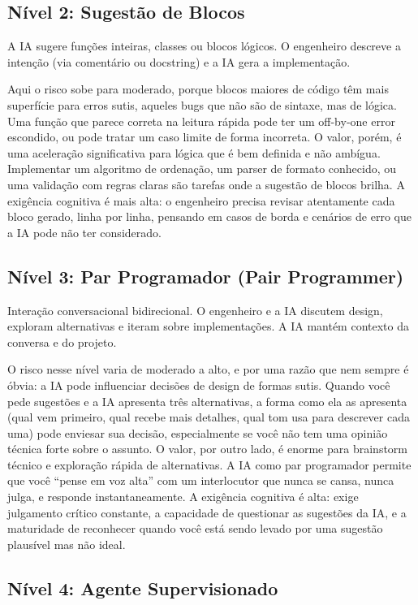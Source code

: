 \subsection{Nível 2: Sugestão de Blocos}

A IA sugere funções inteiras, classes ou blocos lógicos. O engenheiro
descreve a intenção (via comentário ou docstring) e a IA gera a
implementação.

Aqui o risco sobe para moderado, porque blocos maiores de código têm mais superfície
para erros sutis, aqueles bugs que não são de sintaxe, mas de lógica. Uma função
que parece correta na leitura rápida pode ter um off-by-one error escondido, ou pode
tratar um caso limite de forma incorreta. O valor, porém, é uma aceleração
significativa para lógica que é bem definida e não ambígua. Implementar um algoritmo
de ordenação, um parser de formato conhecido, ou uma validação com regras claras são
tarefas onde a sugestão de blocos brilha. A exigência cognitiva é mais alta: o
engenheiro precisa revisar atentamente cada bloco gerado, linha por linha, pensando
em casos de borda e cenários de erro que a IA pode não ter considerado.

\subsection{Nível 3: Par Programador (Pair Programmer)}

Interação conversacional bidirecional. O engenheiro e a IA discutem
design, exploram alternativas e iteram sobre implementações. A IA mantém
contexto da conversa e do projeto.

O risco nesse nível varia de moderado a alto, e por uma razão que nem sempre é
óbvia: a IA pode influenciar decisões de design de formas sutis. Quando você
pede sugestões e a IA apresenta três alternativas, a forma como ela as apresenta
(qual vem primeiro, qual recebe mais detalhes, qual tom usa para descrever cada
uma) pode enviesar sua decisão, especialmente se você não tem uma opinião
técnica forte sobre o assunto. O valor, por outro lado, é enorme para brainstorm
técnico e exploração rápida de alternativas. A IA como par programador permite que
você ``pense em voz alta'' com um interlocutor que nunca se cansa, nunca julga, e
responde instantaneamente. A exigência cognitiva é alta: exige julgamento crítico
constante, a capacidade de questionar as sugestões da IA, e a maturidade de
reconhecer quando você está sendo levado por uma sugestão plausível mas não ideal.

\subsection{Nível 4: Agente Supervisionado}

